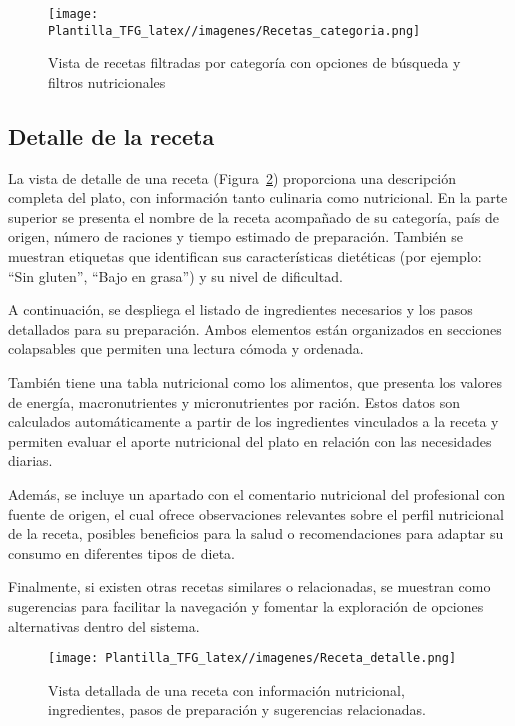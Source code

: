 \begin{figure}[H]
    \centering
    \texttt{[image: Plantilla\_TFG\_latex//imagenes/Recetas\_categoria.png]}
    \caption{Vista de recetas filtradas por categoría con opciones de búsqueda y filtros nutricionales}
    \label{fig:Recetas_categoria}
\end{figure}


\subsection{Detalle de la receta}
La vista de detalle de una receta (Figura~\ref{fig:detalle-receta}) proporciona una descripción completa del plato, con información tanto culinaria como nutricional. En la parte superior se presenta el nombre de la receta acompañado de su categoría, país de origen, número de raciones y tiempo estimado de preparación. También se muestran etiquetas que identifican sus características dietéticas (por ejemplo: “Sin gluten”, “Bajo en grasa”) y su nivel de dificultad.

A continuación, se despliega el listado de ingredientes necesarios y los pasos detallados para su preparación. Ambos elementos están organizados en secciones colapsables que permiten una lectura cómoda y ordenada.

También tiene una tabla nutricional como los alimentos, que presenta los valores de energía, macronutrientes y micronutrientes por ración. Estos datos son calculados automáticamente a partir de los ingredientes vinculados a la receta y permiten evaluar el aporte nutricional del plato en relación con las necesidades diarias.

Además, se incluye un apartado con el comentario nutricional del profesional con fuente de origen, el cual ofrece observaciones relevantes sobre el perfil nutricional de la receta, posibles beneficios para la salud o recomendaciones para adaptar su consumo en diferentes tipos de dieta.

Finalmente, si existen otras recetas similares o relacionadas, se muestran como sugerencias para facilitar la navegación y fomentar la exploración de opciones alternativas dentro del sistema.

\begin{figure}[H]
    \centering
    \texttt{[image: Plantilla\_TFG\_latex//imagenes/Receta\_detalle.png]}
    \caption{Vista detallada de una receta con información nutricional, ingredientes, pasos de preparación y sugerencias relacionadas.}
    \label{fig:detalle-receta}
\end{figure}

